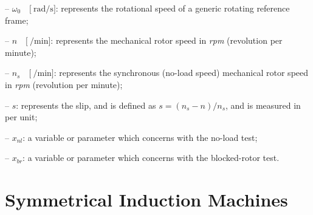 \documentclass[11pt,a4paper,oneside]{book}
\numberwithin{equation}{section}
\theoremstyle{it}
\theoremstyle{definition}
\newenvironment{myitemize_2}
{ \begin{itemize}[topsep=2pt]
		\setlength{\topsep}{4pt}		
		\setlength{\itemsep}{4pt}
		\setlength{\parskip}{4pt}
		\setlength{\parsep}{4pt}     }
	{ \end{itemize}                  }
\begin{document}
\begin{changemargin}{0.5cm}{3cm}
\begin{myitemize_2}
	\item[--] $\omega_0\quad\Big[\SI{}{\radian\per\second}\Big]$: represents the rotational speed of a generic rotating reference frame;
	\item[--] $n\quad\Big[\SI{}{\per\minute}\Big]$: represents the mechanical rotor speed in \textit{rpm} (revolution per minute);
	\item[--] $n_s\quad\Big[\SI{}{\per\minute}\Big]$: represents the synchronous (no-load speed) mechanical rotor speed in \textit{rpm} (revolution per minute);
	\item[--] $s$: represents the slip, and is defined as $s=(n_s - n)/n_s$, and is measured in per unit;
	\item[--] $x_{nl}$: a variable or parameter which concerns with the no-load test;
	\item[--] $x_{br}$: a variable or parameter which concerns with the blocked-rotor test.
\end{myitemize_2}
\end{changemargin}



\chapter{Symmetrical Induction Machines}
\end{document}
